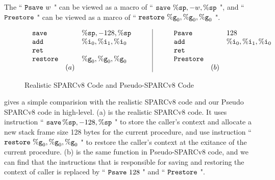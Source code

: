 The `` $\texttt{Psave} \ w$ " can be viewed as a macro of 
`` $\texttt{save}{} \ \%\texttt{sp}, -w, \%\texttt{sp}$ ", and `` $\texttt{Prestore}{}$ " 
can be viewed as a marco of `` $\texttt{restore}{} \ \%\texttt{g}_{0}, \%\texttt{g}_{0}, \%\texttt{g}_{0}$ ". 
\begin{figure}[h]
    \centering
    \[
        \begin{array}{c|c}
            \begin{array}{lcl}
                \texttt{save}{} & \quad & \%\texttt{sp}, -128, \%\texttt{sp} \\
                \texttt{add}{} & & \%\texttt{i}_{0}, \%\texttt{i}_{1}, \%\texttt{i}_{0} \\
                \texttt{ret}{} \\
                \texttt{restore}{} & & \%\texttt{g}_{0}, \%\texttt{g}_{0}, \%\texttt{g}_{0} \\
                & (a)
            \end{array} \qquad & \qquad 
            \begin{array}{lcl}
                \texttt{Psave} & \quad & 128 \\
                \texttt{add}{} & & \%\texttt{i}_{0}, \%\texttt{i}_{1}, \%\texttt{i}_{0} \\
                \texttt{ret}{} \\
                \texttt{Prestore}{} & & \\
                & (b)
            \end{array}
        \end{array}
    \]
    \caption{Realistic SPARCv8 Code and Pseudo-SPARCv8 Code}
    \label{fig:Realistic SPARCv8 Code and Pseudo-SPARCv8 Code}
\end{figure}

\Fig{\ref{fig:Realistic SPARCv8 Code and Pseudo-SPARCv8 Code}} 
gives a simple comparision with the realistic SPARCv8 code 
and our Pseudo SPARCv8 code in high-level. 
\Fig{\ref{fig:Realistic SPARCv8 Code and Pseudo-SPARCv8 Code}} 
(a) is the realistic SPARCv8 code. 
It uses instruction `` $\texttt{save}{} \, \%\texttt{sp}, -128, \%\texttt{sp}$ " 
to store the caller's context and allocate a new stack frame 
size 128 bytes for the current procedure, and use instruction
`` $\texttt{restore}{} \ \%\texttt{g}_{0}, \%\texttt{g}_{0}, \%\texttt{g}_{0}$ " to restore 
the caller's context at the exitance of the current procedure. 
\Fig{\ref{fig:Realistic SPARCv8 Code and Pseudo-SPARCv8 Code}} (b) is 
the same function in Pseudo-SPARCv8 code, 
and we can find that the instructions that 
is responsible for saving and restoring the context of caller
is replaced by `` $\texttt{Psave} \ 128$ " and `` $\texttt{Prestore}$ ". 